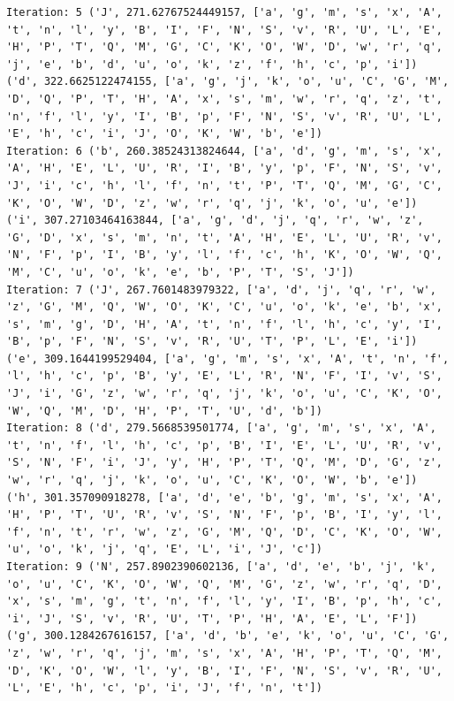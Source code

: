 \documentclass[11pt]{article}
\begin{document}
\begin{lstlisting}
Iteration: 5 ('J', 271.62767524449157, ['a', 'g', 'm', 's', 'x', 'A', 't', 'n', 'l', 'y', 'B', 'I', 'F', 'N', 'S', 'v', 'R', 'U', 'L', 'E', 'H', 'P', 'T', 'Q', 'M', 'G', 'C', 'K', 'O', 'W', 'D', 'w', 'r', 'q', 'j', 'e', 'b', 'd', 'u', 'o', 'k', 'z', 'f', 'h', 'c', 'p', 'i']) ('d', 322.6625122474155, ['a', 'g', 'j', 'k', 'o', 'u', 'C', 'G', 'M', 'D', 'Q', 'P', 'T', 'H', 'A', 'x', 's', 'm', 'w', 'r', 'q', 'z', 't', 'n', 'f', 'l', 'y', 'I', 'B', 'p', 'F', 'N', 'S', 'v', 'R', 'U', 'L', 'E', 'h', 'c', 'i', 'J', 'O', 'K', 'W', 'b', 'e'])
Iteration: 6 ('b', 260.38524313824644, ['a', 'd', 'g', 'm', 's', 'x', 'A', 'H', 'E', 'L', 'U', 'R', 'I', 'B', 'y', 'p', 'F', 'N', 'S', 'v', 'J', 'i', 'c', 'h', 'l', 'f', 'n', 't', 'P', 'T', 'Q', 'M', 'G', 'C', 'K', 'O', 'W', 'D', 'z', 'w', 'r', 'q', 'j', 'k', 'o', 'u', 'e']) ('i', 307.27103464163844, ['a', 'g', 'd', 'j', 'q', 'r', 'w', 'z', 'G', 'D', 'x', 's', 'm', 'n', 't', 'A', 'H', 'E', 'L', 'U', 'R', 'v', 'N', 'F', 'p', 'I', 'B', 'y', 'l', 'f', 'c', 'h', 'K', 'O', 'W', 'Q', 'M', 'C', 'u', 'o', 'k', 'e', 'b', 'P', 'T', 'S', 'J'])
Iteration: 7 ('J', 267.7601483979322, ['a', 'd', 'j', 'q', 'r', 'w', 'z', 'G', 'M', 'Q', 'W', 'O', 'K', 'C', 'u', 'o', 'k', 'e', 'b', 'x', 's', 'm', 'g', 'D', 'H', 'A', 't', 'n', 'f', 'l', 'h', 'c', 'y', 'I', 'B', 'p', 'F', 'N', 'S', 'v', 'R', 'U', 'T', 'P', 'L', 'E', 'i']) ('e', 309.1644199529404, ['a', 'g', 'm', 's', 'x', 'A', 't', 'n', 'f', 'l', 'h', 'c', 'p', 'B', 'y', 'E', 'L', 'R', 'N', 'F', 'I', 'v', 'S', 'J', 'i', 'G', 'z', 'w', 'r', 'q', 'j', 'k', 'o', 'u', 'C', 'K', 'O', 'W', 'Q', 'M', 'D', 'H', 'P', 'T', 'U', 'd', 'b'])
Iteration: 8 ('d', 279.5668539501774, ['a', 'g', 'm', 's', 'x', 'A', 't', 'n', 'f', 'l', 'h', 'c', 'p', 'B', 'I', 'E', 'L', 'U', 'R', 'v', 'S', 'N', 'F', 'i', 'J', 'y', 'H', 'P', 'T', 'Q', 'M', 'D', 'G', 'z', 'w', 'r', 'q', 'j', 'k', 'o', 'u', 'C', 'K', 'O', 'W', 'b', 'e']) ('h', 301.357090918278, ['a', 'd', 'e', 'b', 'g', 'm', 's', 'x', 'A', 'H', 'P', 'T', 'U', 'R', 'v', 'S', 'N', 'F', 'p', 'B', 'I', 'y', 'l', 'f', 'n', 't', 'r', 'w', 'z', 'G', 'M', 'Q', 'D', 'C', 'K', 'O', 'W', 'u', 'o', 'k', 'j', 'q', 'E', 'L', 'i', 'J', 'c'])
Iteration: 9 ('N', 257.8902390602136, ['a', 'd', 'e', 'b', 'j', 'k', 'o', 'u', 'C', 'K', 'O', 'W', 'Q', 'M', 'G', 'z', 'w', 'r', 'q', 'D', 'x', 's', 'm', 'g', 't', 'n', 'f', 'l', 'y', 'I', 'B', 'p', 'h', 'c', 'i', 'J', 'S', 'v', 'R', 'U', 'T', 'P', 'H', 'A', 'E', 'L', 'F']) ('g', 300.1284267616157, ['a', 'd', 'b', 'e', 'k', 'o', 'u', 'C', 'G', 'z', 'w', 'r', 'q', 'j', 'm', 's', 'x', 'A', 'H', 'P', 'T', 'Q', 'M', 'D', 'K', 'O', 'W', 'l', 'y', 'B', 'I', 'F', 'N', 'S', 'v', 'R', 'U', 'L', 'E', 'h', 'c', 'p', 'i', 'J', 'f', 'n', 't'])

\end{lstlisting}
\end{document}

